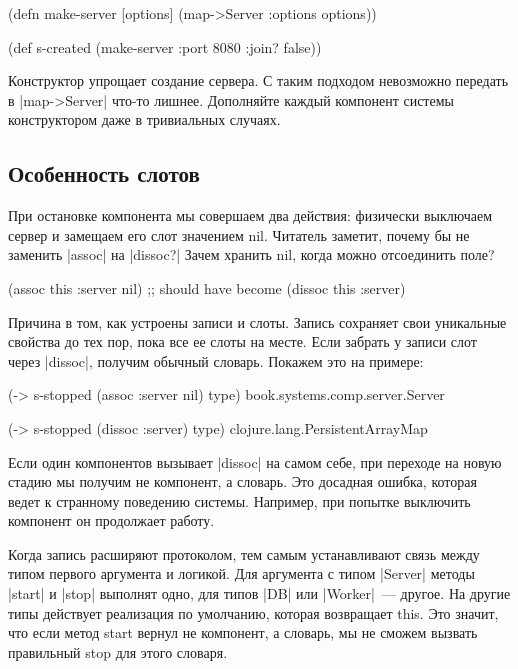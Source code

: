 \begin{code}
(defn make-server
  [options]
  (map->Server {:options options}))

(def s-created (make-server {:port 8080 :join? false}))
\end{code}

Конструктор упрощает создание сервера. С таким подходом невозможно передать в
\spverb|map->Server| что-то лишнее. Дополняйте каждый компонент системы конструктором
даже в тривиальных случаях.

\subsection{Особенность слотов}

При остановке компонента мы совершаем два действия: физически выключаем сервер и
замещаем его слот значением nil. Читатель заметит, почему бы не заменить \spverb|assoc|
на \spverb|dissoc?| Зачем хранить nil, когда можно отсоединить поле?

\begin{code}
(assoc this :server nil)
;; should have become
(dissoc this :server)
\end{code}

Причина в том, как устроены записи и слоты. Запись сохраняет свои уникальные
свойства до тех пор, пока все ее слоты на месте. Если забрать у записи слот
через \spverb|dissoc|, получим обычный словарь. Покажем это на примере:

\begin{code}
(-> s-stopped (assoc :server nil) type)
book.systems.comp.server.Server

(-> s-stopped (dissoc :server) type)
clojure.lang.PersistentArrayMap
\end{code}

Если один компонентов вызывает \spverb|dissoc| на самом себе, при переходе на новую
стадию мы получим не компонент, а словарь. Это досадная ошибка, которая ведет к
странному поведению системы. Например, при попытке выключить компонент он
продолжает работу.

Когда запись расширяют протоколом, тем самым устанавливают связь между типом
первого аргумента и логикой. Для аргумента с типом \spverb|Server| методы \spverb|start| и
\spverb|stop| выполнят одно, для типов \spverb|DB| или \spverb|Worker|~--- другое. На другие типы
действует реализация по умолчанию, которая возвращает this. Это значит, что если
метод start вернул не компонент, а словарь, мы не сможем вызвать правильный stop
для этого словаря.

